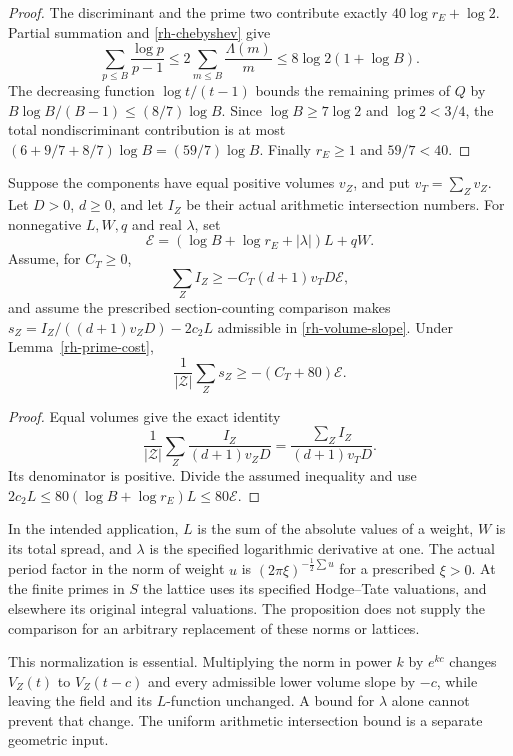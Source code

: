 \begin{proof}
The discriminant and the prime two contribute exactly
$40\log r_E+\log2$. Partial summation and \eqref{rh-chebyshev} give
\[
 \sum_{p\le B}\frac{\log p}{p-1}
 \le2\sum_{m\le B}\frac{\Lambda(m)}m
 \le8\log2(1+\log B).
\]
The decreasing function $\log t/(t-1)$ bounds the remaining primes
of $Q$ by $B\log B/(B-1)\le(8/7)\log B$.
Since $\log B\ge7\log2$ and $\log2<3/4$, the total
nondiscriminant contribution is at most
$(6+9/7+8/7)\log B=(59/7)\log B$.
Finally $r_E\ge1$ and $59/7<40$.
\end{proof}

\begin{proposition}
\label{rh-intersection-mean}
Suppose the components have equal positive volumes $v_Z$, and put
$v_T=\sum_Zv_Z$. Let $D>0$, $d\ge0$, and let $I_Z$ be their actual
arithmetic intersection numbers. For nonnegative $L,W,q$ and real
$\lambda$, set
\[
 \mathcal E=(\log B+\log r_E+|\lambda|)L+qW.
\]
Assume, for $C_T\ge0$,
\[
 \sum_ZI_Z\ge-C_T(d+1)v_TD\mathcal E,
\]
and assume the prescribed section-counting comparison makes
$s_Z=I_Z/((d+1)v_ZD)-2c_2L$ admissible in
\eqref{rh-volume-slope}. Under Lemma~\ref{rh-prime-cost},
\begin{equation}\label{rh-intersection-result}
                  \frac1{|\mathcal Z|}\sum_Zs_Z
                         \ge-(C_T+80)\mathcal E.
\end{equation}
\end{proposition}

\begin{proof}
Equal volumes give the exact identity
\[
 \frac1{|\mathcal Z|}\sum_Z\frac{I_Z}{(d+1)v_ZD}
                  =\frac{\sum_ZI_Z}{(d+1)v_TD}.
\]
Its denominator is positive. Divide the assumed inequality and use
$2c_2L\le80(\log B+\log r_E)L\le80\mathcal E$.
\end{proof}

In the intended application, $L$ is the sum of the absolute values
of a weight, $W$ is its total spread, and $\lambda$ is the specified
logarithmic derivative at one. The actual period factor in the norm
of weight $u$ is $(2\pi\xi)^{-\frac12\sum u}$ for a prescribed
$\xi>0$. At the finite primes in $S$ the lattice uses its specified
Hodge--Tate valuations, and elsewhere its original integral valuations.
The proposition does not supply the comparison for an arbitrary
replacement of these norms or lattices.

This normalization is essential. Multiplying the norm in power $k$
by $e^{kc}$ changes $V_Z(t)$ to $V_Z(t-c)$ and every admissible
lower volume slope by $-c$, while leaving the field and its
$L$-function unchanged. A bound for $\lambda$ alone cannot prevent
that change. The uniform arithmetic intersection bound is a separate
geometric input.

